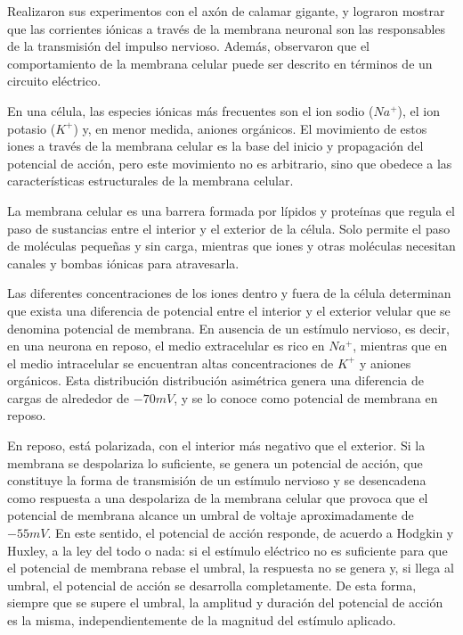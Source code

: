\documentclass[aps,prl,reprint,groupedaddress]{revtex4-2}
\begin{document}
Realizaron sus experimentos con el axón de calamar gigante, y lograron mostrar 
que las corrientes iónicas a través de la membrana neuronal son las responsables 
de la transmisión del impulso nervioso. Además, observaron 
que el comportamiento de la membrana celular puede ser descrito en
términos de un circuito eléctrico.

En una célula, las especies iónicas más frecuentes son el ion sodio ($Na^{+}$), 
el ion potasio ($K^{+}$) y, en menor medida, aniones orgánicos. El movimiento 
de estos iones a través de la membrana celular es la base del inicio y 
propagación del potencial de acción, pero este movimiento no es arbitrario, 
sino que obedece a las características estructurales de la membrana celular.

La membrana celular es una barrera formada por lípidos y proteínas que regula 
el paso de sustancias entre el interior y el exterior de la célula. Solo 
permite el paso de moléculas pequeñas y sin carga, mientras que iones y 
otras moléculas necesitan canales y bombas iónicas para atravesarla. 

Las diferentes concentraciones de los iones dentro y fuera de la célula 
determinan que exista una diferencia de potencial entre el interior y el exterior 
velular que se denomina potencial de membrana. En ausencia de un estímulo nervioso, 
es decir, en una neurona en reposo, el medio extracelular es rico en $Na^{+}$, 
mientras que en el medio intracelular se encuentran altas concentraciones de
$K^{+}$ y aniones orgánicos. Esta distribución distribución asimétrica genera 
una diferencia de cargas de alrededor de $-70mV$, y se lo conoce como 
potencial de membrana en reposo. 

En reposo, está polarizada, con el interior más negativo que el exterior. 
Si la membrana se despolariza lo suficiente, se genera un potencial de acción, 
que constituye la forma de transmisión de un estímulo nervioso y se desencadena 
como respuesta a una despolariza de la membrana celular que provoca que el 
potencial de membrana alcance un umbral de voltaje aproximadamente de $-55mV$. 
En este sentido, el potencial de acción responde, de acuerdo a Hodgkin y Huxley, 
a la ley del todo o nada: si el estímulo eléctrico no es suficiente para que 
el potencial de membrana rebase el umbral, la respuesta no se genera y, 
si llega al umbral, el potencial de acción se desarrolla completamente. 
De esta forma, siempre que se supere el umbral, la amplitud y duración del 
potencial de acción es la misma, independientemente de la magnitud del 
estímulo aplicado.
\end{document}
